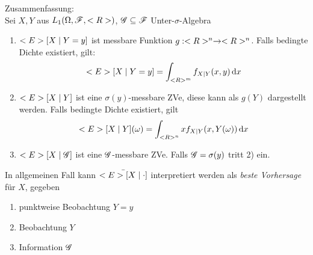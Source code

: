 Zusammenfassung:\\
Sei $X,Y$ aus $L_1(\Omega,\mathscr F,<R>)$, $\mathscr{G} \subseteq \mathscr F$ Unter-$\sigma$-Algebra
\begin{enumerate}
	\item $<E>[X\mid Y=y]$ ist messbare Funktion $g: <R>^n \to <R>^n$. Falls bedingte Dichte existiert, gilt:
	\begin{align*}
		<E>[X\mid Y=y] = \int_{<R>^m} f_{X\mid Y} (x,y) \,\mathrm{d} x
	\end{align*}
	\item $<E>[X\mid Y]$ ist eine $\sigma(y)$-messbare ZVe, diese kann als $g(Y)$ dargestellt werden. Falls bedingte Dichte existiert, gilt
	\begin{align*}
		<E>[X\mid Y](\omega) = \int_{<R>^n}xf_{X\mid Y}(x,Y(\omega))\,\mathrm{d} x
	\end{align*}
	\item $<E>[X \mid \mathscr{G}]$ ist eine $\mathscr{G}$-messbare ZVe. Falls $\mathscr{G} = \sigma(y)$ tritt 2) ein.
\end{enumerate}
In allgemeinen Fall kann $\bar{<E>[X\mid \cdot]}$ interpretiert werden als \emph{beste Vorhersage} für $X$, gegeben
\begin{enumerate}
	\item punktweise Beobachtung $Y=y$
	\item Beobachtung $Y$
	\item Information $\mathscr{G}$
\end{enumerate}
